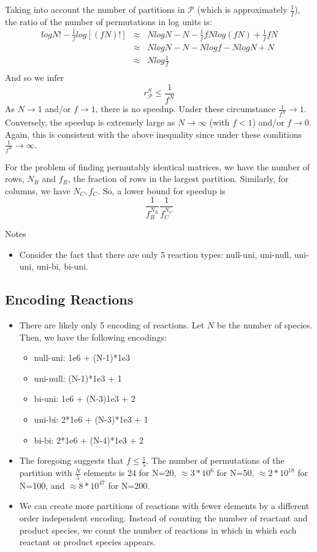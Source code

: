 \documentclass{article}
\begin{document}
Taking into account the number of partitions in $\mathcal{P}$ (which is approximately $\frac{1}{f}$),
the ratio of the number of permutations in log units is:
\begin{eqnarray}
    log N! - \frac{1}{f}  log \left[ (fN)! \right]  
    & \approx &
    N log N - N -
    \frac{1}{f} fN log (f N) + \frac{1}{f} fN \\
    & \approx &
    N log N - N -
    N log f - N log N + N \\
    & \approx &
    N log \frac{1}{f} \\
\end{eqnarray}
And so we infer
$$r_{\mathcal{P}}^S \leq {\frac{1}{f^N}}$$
As $N \rightarrow 1$ and/or $f \rightarrow 1$, there is no speedup. Under these circumstance
$\frac{1}{f^N} \rightarrow 1.$ Conversely, the speedup is extremely large as $N \rightarrow \infty$ (with $f < 1$) and/or $f \rightarrow 0$. Again, this is consistent with the above inequality since under these conditions $\frac{1}{f^N} \rightarrow \infty.$

For the problem of finding permutably identical matrices, we have the number of rows, $N_R$ and $f_R$, the fraction of rows in the largest partition. Similarly, for columns, we have $N_C, f_C$. So, a lower bound for speedup is
$$\frac{1}{f_R^{N_R}} \frac{1}{f_C^{N_C}}$$

Notes
\begin{itemize}
    \item Consider the fact that there are only 5 reaction types: null-uni, uni-null, uni-uni, uni-bi, bi-uni.
\end{itemize}

\subsection{Encoding Reactions}
\begin{itemize}
    \item There are likely only 5 encoding of reactions. Let $N$ be the number of species. Then, we have the following encodings:
    \begin{itemize}
        \item null-uni: 1e6 + (N-1)*1e3
        \item uni-null: (N-1)*1e3 + 1
        \item bi-uni: 1e6 + (N-3)1e3 + 2
        \item uni-bi: 2*1e6 + (N-3)*1e3 + 1
        \item bi-bi: 2*1e6 + (N-4)*1e3 + 2
    \end{itemize}
    \item The foregoing suggests that $f \leq \frac{1}{5}$. The number of permutations of the partition with $\frac{N}{5}$ elements is
    24 for N=20, $\approx 3*10^6$ for N=50, 
     $\approx 2*10^{18}$ for N=100, and  $\approx 8*10^{47}$ for N=200.
     \item We can create more partitions of reactions with fewer elements by a different order independent encoding. Instead of counting the number of reactant and product species, we count the number of reactions in which in which each reactant or product species appears.
\end{itemize}
\end{document}
